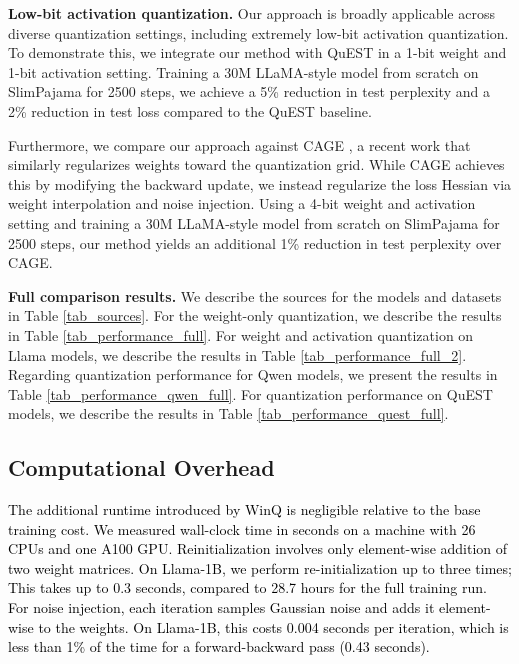 \documentclass{article}
\theoremstyle{definition}
\newcommand{\revision}[1]{\textcolor{black}{#1}}
\newcommand{\acronym}{{\sc WinQ}}
\begin{document}
\textbf{Low-bit activation quantization.} Our approach is broadly applicable across diverse quantization settings, including extremely low-bit activation quantization. To demonstrate this, we integrate our method with QuEST \cite{panferov2025quest} in a 1-bit weight and 1-bit activation setting. Training a 30M LLaMA-style model from scratch on SlimPajama for 2500 steps, we achieve a 5\% reduction in test perplexity and a 2\% reduction in test loss compared to the QuEST baseline.

Furthermore, we compare our approach against CAGE \cite{tabesh2025cage}, a recent work that similarly regularizes weights toward the quantization grid. While CAGE achieves this by modifying the backward update, we instead regularize the loss Hessian via weight interpolation and noise injection. Using a 4-bit weight and activation setting and training a 30M LLaMA-style model from scratch on SlimPajama for 2500 steps, our method yields an additional 1\% reduction in test perplexity over CAGE.

\textbf{Full comparison results.}
We describe the sources for the models and datasets in Table \ref{tab_sources}. 
For the weight-only quantization, we describe the results in Table \ref{tab_performance_full}. 
For weight and activation quantization on Llama models, we describe the results in Table \ref{tab_performance_full_2}. 
Regarding quantization performance for Qwen models, we present the results in Table \ref{tab_performance_qwen_full}.
For quantization performance on QuEST models, we describe the results in Table \ref{tab_performance_quest_full}. 




\subsection{Computational Overhead}

\revision{The additional runtime introduced by \acronym{} is negligible relative to the base training cost. We measured wall-clock time in seconds on a machine with 26 CPUs and one A100 GPU.
Reinitialization involves only element-wise addition of two weight matrices. On Llama-1B, we perform re-initialization up to three times; This takes up to 0.3 seconds, compared to 28.7 hours for the full training run.
For noise injection, each iteration samples Gaussian noise and adds it element-wise to the weights. On Llama-1B, this costs 0.004 seconds per iteration, which is less than 1\% of the time for a forward-backward pass (0.43 seconds).}
\end{document}
